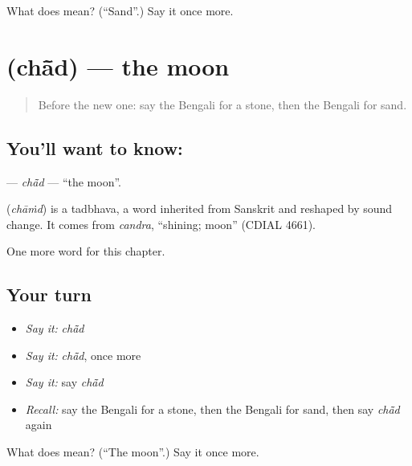 \begin{tcolorbox}[breakable,colback=teal!4,colframe=teal!35!black,title={Before you move on}]
What does  mean? (\textquotedblleft{}Sand\textquotedblright{}.) Say it once more.
\end{tcolorbox}
\section[\texorpdfstring{\bn{চাঁদ} (chā̃d)}{চাঁদ (chā̃d)}]{ (chā̃d) — the moon}

\label{lesson:BN-C67-chad}



\begin{quote}
Before the new one: say the Bengali for a stone, then the Bengali for sand.
\end{quote}

\subsection*{You'll want to know: }
\textbf{} — \emph{chā̃d} — \textquotedblleft{}the moon\textquotedblright{}.

\begin{cousinweb}
\textbf{} (\emph{chāṁd}) is a tadbhava, a word inherited from Sanskrit and reshaped by sound change. It comes from \emph{candra}, \textquotedblleft{}shining; moon\textquotedblright{} (CDIAL 4661).
\end{cousinweb}

\begin{grammarlens}[title={What you've built}]
One more word for this chapter.
\end{grammarlens}

\subsection*{Your turn}
\begin{itemize}
\raggedright
  \item \emph{Say it:} \emph{chā̃d}
  \item \emph{Say it:} \emph{chā̃d}, once more
  \item \emph{Say it:} say \emph{chā̃d}
  \item \emph{Recall:} say the Bengali for a stone, then the Bengali for sand, then say \emph{chā̃d} again
\end{itemize}

\begin{tcolorbox}[breakable,colback=teal!4,colframe=teal!35!black,title={Before you move on}]
What does  mean? (\textquotedblleft{}The moon\textquotedblright{}.) Say it once more.
\end{tcolorbox}
